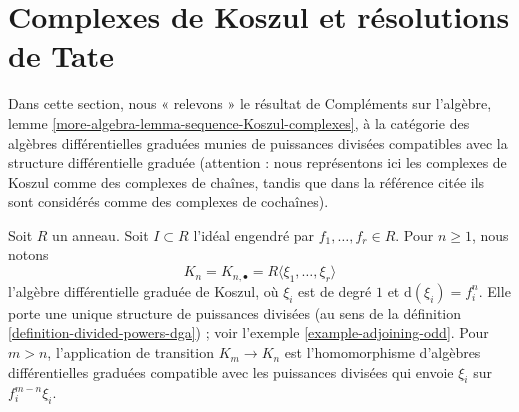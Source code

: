 \section{Complexes de Koszul et résolutions de Tate}

\label{section-koszul-vs-tate}

\noindent
Dans cette section, nous « relevons » le résultat de Compléments sur l'algèbre, lemme \ref{more-algebra-lemma-sequence-Koszul-complexes}, à la catégorie des algèbres différentielles graduées munies de puissances divisées compatibles avec la structure différentielle graduée (attention : nous représentons ici les complexes de Koszul comme des complexes de chaînes, tandis que dans la référence citée ils sont considérés comme des complexes de cochaînes).

\medskip\noindent
Soit $R$ un anneau. Soit $I \subset R$ l'idéal engendré par $f_1, \ldots, f_r \in R$. Pour $n \geq 1$, nous notons
$$
K_n = K_{n, \bullet} = R\langle \xi_1, \ldots, \xi_r\rangle
$$
l'algèbre différentielle graduée de Koszul, où $\xi_i$ est de degré $1$ et $\text{d}(\xi_i) = f_i^n$. Elle porte une unique structure de puissances divisées (au sens de la définition \ref{definition-divided-powers-dga}) ; voir l'exemple \ref{example-adjoining-odd}. Pour $m > n$, l'application de transition $K_m \to K_n$ est l'homomorphisme d'algèbres différentielles graduées compatible avec les puissances divisées qui envoie $\xi_i$ sur $f_i^{m - n}\xi_i$.

